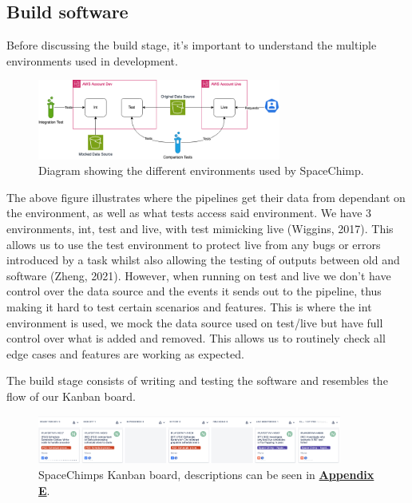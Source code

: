 \subsection{Build software}
  Before discussing the build stage, it's important to understand the multiple environments used in development.

  \begin{figure}[H]
    \centering
    \includegraphics[width=8cm]{assets/environments.drawio.png}
    \caption{Diagram showing the different environments used by SpaceChimp.}
    \label{fig:environments}
  \end{figure}

  The above figure illustrates where the pipelines get their data from dependant on the environment, as well as what tests access said environment.
  We have 3 environments, int, test and live, with test mimicking live (Wiggins, 2017). This allows us to use the test environment to protect live from 
  any bugs or errors introduced by a task whilst also allowing the testing of outputs between old and software (Zheng, 2021). However, when running on test
  and live we don't have control over the data source and the events it sends out to the pipeline, thus making it hard to test certain scenarios and features.
  This is where the int environment is used, we mock the data source used on test/live but have full control over what is added and removed. This allows 
  us to routinely check all edge cases and features are working as expected.

  \vspace{0.2cm}

  The build stage consists of writing and testing the software and resembles the flow of our Kanban board.

  \begin{figure}[H]
    \centering
    \includegraphics[width=10cm]{assets/kanbanBoard.png}
    \caption{SpaceChimps Kanban board, descriptions can be seen in \hyperref[sec:AppendixE]{\textbf{Appendix E}}.}
    \label{fig:kanbanBoard2}
  \end{figure}


